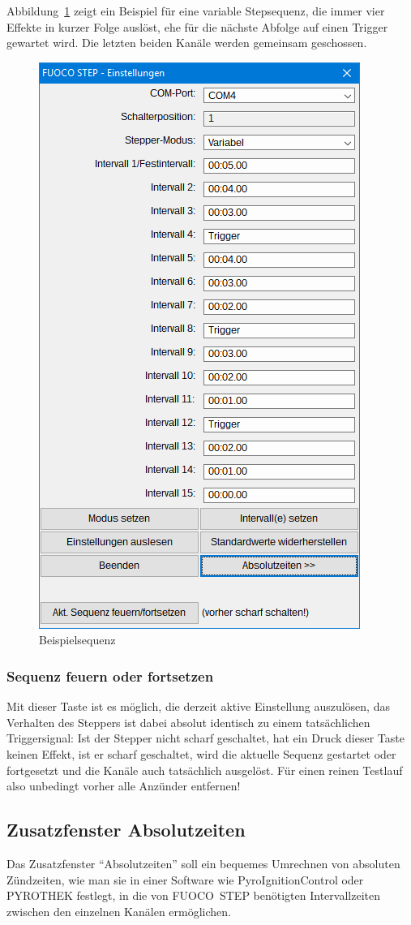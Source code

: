 \documentclass[paper=a4, open=any, numbers=noenddot]{scrbook}
\begin{document}
					Abbildung~\ref{fig:beispielsequenz} zeigt ein Beispiel für eine variable Stepsequenz, die immer vier Effekte in kurzer Folge auslöst, ehe für die nächste Abfolge auf einen Trigger gewartet wird. Die letzten beiden Kanäle werden gemeinsam geschossen.

					\begin{figure}[tb]
						\centering\includegraphics[width=.5\textwidth]{Bilder/beispielshow}
						\caption{Beispielsequenz}
						\label{fig:beispielsequenz}
					\end{figure}

				\subsubsection*{Sequenz feuern oder fortsetzen}

					Mit dieser Taste ist es möglich, die derzeit aktive Einstellung auszulösen, das Verhalten des Steppers ist dabei absolut identisch zu einem tatsächlichen Triggersignal: Ist der Stepper nicht scharf geschaltet, hat ein Druck dieser Taste keinen Effekt, ist er scharf geschaltet, wird die aktuelle Sequenz gestartet oder fortgesetzt und die Kanäle auch tatsächlich ausgelöst. Für einen reinen Testlauf also unbedingt vorher alle Anzünder entfernen!

			\subsection{Zusatzfenster Absolutzeiten}
				\label{sec:absolutzeiten}
				Das Zusatzfenster \enquote{Absolutzeiten} soll ein bequemes Umrechnen von absoluten Zündzeiten, wie man sie in einer Software wie PyroIgnitionControl oder PYROTHEK festlegt, in die von FUOCO~STEP benötigten Intervallzeiten zwischen den einzelnen Kanälen ermöglichen.
\end{document}
